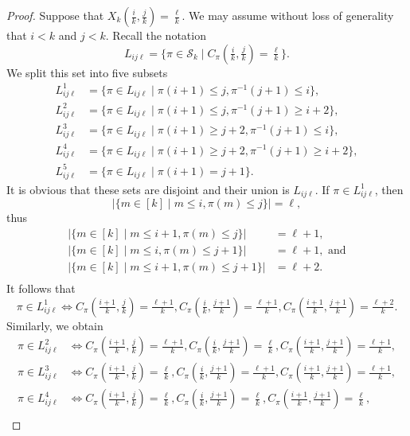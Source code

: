 \documentclass[10pt,a4paper]{amsart}
\newcommand{\SK}{\mathcal{S}_k}
\begin{document}
\begin{proof}
Suppose that $X_k(\tfrac{i}{k},\tfrac{j}{k}) = \tfrac{\ell}{k}$. We may assume without loss of generality that $i<k$ and $j<k$. Recall the notation 
$$L_{ij\ell} = \{\pi \in \SK \mid C_\pi(\tfrac{i}{k},\tfrac{j}{k}) = \tfrac{\ell}{k}\}. $$
We split this set into five subsets
\begin{align*}
   L_{ij\ell}^1 &= \{\pi \in L_{ij\ell} \mid \pi(i+1)\le j, \pi^{-1}(j+1)\le i\}, \\
   L_{ij\ell}^2 &= \{\pi \in L_{ij\ell} \mid \pi(i+1)\le j, \pi^{-1}(j+1)\ge i+2\}, \\
   L_{ij\ell}^3 &= \{\pi \in L_{ij\ell} \mid \pi(i+1)\ge j+2, \pi^{-1}(j+1)\le i\}, \\
   L_{ij\ell}^4 &= \{\pi \in L_{ij\ell} \mid \pi(i+1)\ge j+2, \pi^{-1}(j+1)\ge i+2\}, \\
   L_{ij\ell}^5 &= \{\pi \in L_{ij\ell} \mid \pi(i+1) = j+1\}. 
\end{align*}
It is obvious that these sets are disjoint and their union is $L_{ij\ell}$. If $\pi \in L_{ij\ell}^1$, then 
$$|\{m \in [k] \mid m\le i, \pi(m) \le j\}| = \ell,$$
thus
\begin{align*}
    |\{m \in [k] \mid m\le i+1, \pi(m) \le j\}| &= \ell+1, \\
    |\{m \in [k] \mid m\le i, \pi(m) \le j+1\}| &= \ell+1,  \text{ and}\\
    |\{m \in [k] \mid m\le i+1, \pi(m) \le j+1\}| &= \ell+2. \\
\end{align*} 
It follows that
\begin{equation} \label{eq:Lijl1}
    \pi \in L_{ij\ell}^1 \Leftrightarrow C_\pi(\tfrac{i+1}{k},\tfrac{j}{k}) = \tfrac{\ell+1}{k},  C_\pi(\tfrac{i}{k},\tfrac{j+1}{k}) = \tfrac{\ell+1}{k},  C_\pi(\tfrac{i+1}{k},\tfrac{j+1}{k}) = \tfrac{\ell+2}{k}.
\end{equation} 
Similarly, we obtain
\begin{align*}
   \pi \in L_{ij\ell}^2 &\Leftrightarrow C_\pi(\tfrac{i+1}{k},\tfrac{j}{k}) = \tfrac{\ell+1}{k},  C_\pi(\tfrac{i}{k},\tfrac{j+1}{k}) = \tfrac{\ell}{k},  C_\pi(\tfrac{i+1}{k},\tfrac{j+1}{k}) = \tfrac{\ell+1}{k}, \\
   \pi \in L_{ij\ell}^3 &\Leftrightarrow C_\pi(\tfrac{i+1}{k},\tfrac{j}{k}) = \tfrac{\ell}{k},  C_\pi(\tfrac{i}{k},\tfrac{j+1}{k}) = \tfrac{\ell+1}{k},  C_\pi(\tfrac{i+1}{k},\tfrac{j+1}{k}) = \tfrac{\ell+1}{k}, \\
   \pi \in L_{ij\ell}^4 &\Leftrightarrow C_\pi(\tfrac{i+1}{k},\tfrac{j}{k}) = \tfrac{\ell}{k},  C_\pi(\tfrac{i}{k},\tfrac{j+1}{k}) = \tfrac{\ell}{k},  C_\pi(\tfrac{i+1}{k},\tfrac{j+1}{k}) = \tfrac{\ell}{k}, \\

\end{align*}
\end{proof}
\end{document}
